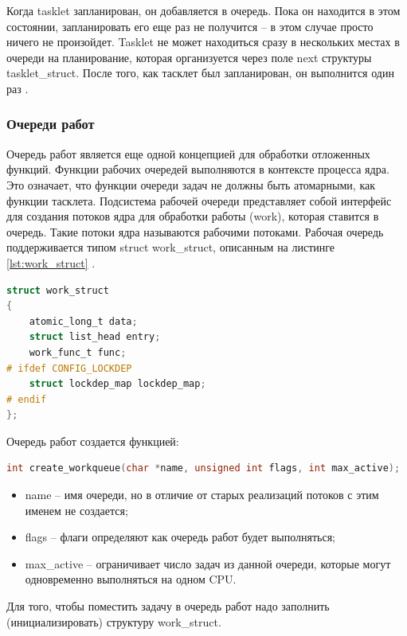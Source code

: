 Когда tasklet запланирован, он добавляется в очередь. Пока он находится в этом состоянии, запланировать его еще раз не получится -- в этом случае просто ничего не произойдет. Tasklet не может находиться сразу в нескольких местах в очереди на планирование, которая организуется через поле next структуры tasklet\_struct. После того, как тасклет был запланирован, он выполнится один раз \cite{Tasklets}.

\subsubsection{Очереди работ}

Очередь работ является еще одной концепцией для обработки отложенных функций. Функции рабочих очередей выполняются в контексте процесса ядра. Это означает, что функции очереди задач не должны быть атомарными, как функции тасклета. Подсистема рабочей очереди представляет собой интерфейс для создания потоков ядра для обработки работы (work), которая ставится в очередь. Такие потоки ядра называются рабочими потоками. Рабочая очередь поддерживается типом struct work\_struct, описанным на листинге \ref{lst:work_struct} \cite{WorkQueue}.

\begin{lstlisting}[language=c,caption=Структура work\_struct,label=lst:work_struct]
struct work_struct
{
    atomic_long_t data;
    struct list_head entry;
    work_func_t func;
# ifdef CONFIG_LOCKDEP
    struct lockdep_map lockdep_map;
# endif
};
\end{lstlisting}

Очередь работ создается функцией:

\begin{lstlisting}[language=c]
int create_workqueue(char *name, unsigned int flags, int max_active);
\end{lstlisting}

\begin{itemize}
    \item name -- имя очереди, но в отличие от старых реализаций потоков с этим именем не создается;
    \item flags -- флаги определяют как очередь работ будет выполняться;
    \item max\_active -- ограничивает число задач из данной очереди, которые могут одновременно выполняться на одном CPU.
\end{itemize}

Для того, чтобы поместить задачу в очередь работ надо заполнить (инициализировать) структуру work\_struct.

